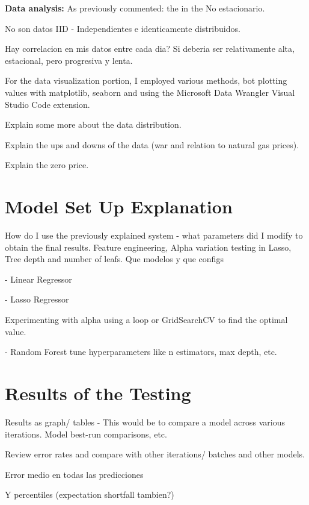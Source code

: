 \documentclass[12pt]{report} %
\begin{document}
\noindent \textbf{Data analysis:}
As previously commented: the in the
No estacionario.

No son datos IID - Independientes e identicamente distribuidos.

Hay correlacion en mis datos entre cada dia? Si deberia ser relativamente alta, estacional, pero progresiva y lenta.


For the data visualization portion, I employed various methods, bot plotting values with matplotlib, seaborn and using the Microsoft Data Wrangler Visual Studio Code extension.

Explain some more about the data distribution.

Explain the ups and downs of the data (war and relation to natural gas prices).

Explain the zero price.

\section{Model Set Up Explanation}
How do I use the previously explained system - what parameters did I modify to obtain the final results. Feature engineering, Alpha variation testing in Lasso, Tree depth and number of leafs.
Que modelos y que configs

- Linear Regressor

- Lasso Regressor

Experimenting with alpha using a loop or GridSearchCV to find the optimal value.

- Random Forest
tune hyperparameters like n estimators, max depth, etc.

\section{Results of the Testing}
Results as graph/ tables - This would be to compare a model across various iterations. Model best-run comparisons, etc.

Review error rates and compare with other iterations/ batches and other models.

Error medio en todas las predicciones

Y percentiles (expectation shortfall tambien?)
\end{document}
